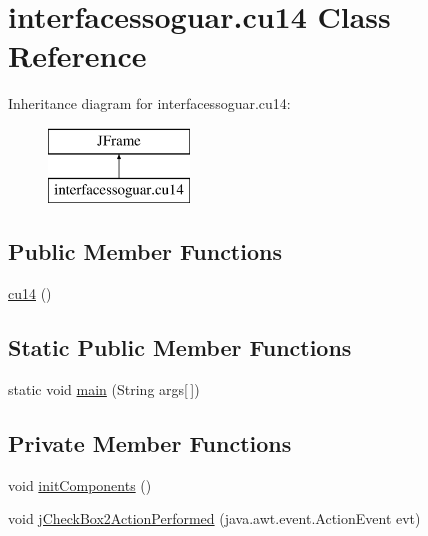 \hypertarget{classinterfacessoguar_1_1cu14}{}\section{interfacessoguar.\+cu14 Class Reference}
\label{classinterfacessoguar_1_1cu14}
Inheritance diagram for interfacessoguar.\+cu14\+:\begin{figure}[H]
\begin{center}
\leavevmode
\includegraphics[height=2.000000cm]{classinterfacessoguar_1_1cu14}
\end{center}
\end{figure}
\subsection*{Public Member Functions}
\begin{DoxyCompactItemize}
\item 
\mbox{\hyperlink{classinterfacessoguar_1_1cu14_a0d92e122ad24e9589bfceac28cc7e92a}{cu14}} ()
\end{DoxyCompactItemize}
\subsection*{Static Public Member Functions}
\begin{DoxyCompactItemize}
\item 
static void \mbox{\hyperlink{classinterfacessoguar_1_1cu14_a35674955efbc5d934ec6d0e2c2123977}{main}} (String args\mbox{[}$\,$\mbox{]})
\end{DoxyCompactItemize}
\subsection*{Private Member Functions}
\begin{DoxyCompactItemize}
\item 
void \mbox{\hyperlink{classinterfacessoguar_1_1cu14_af595a2c979588bc79be0ca6bd0a87fb5}{init\+Components}} ()
\item 
void \mbox{\hyperlink{classinterfacessoguar_1_1cu14_ab06e0dd8b0c928c7b075a14a321a95d3}{j\+Check\+Box2\+Action\+Performed}} (java.\+awt.\+event.\+Action\+Event evt)
\end{DoxyCompactItemize}
